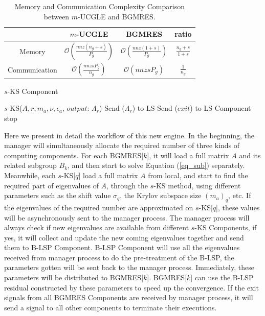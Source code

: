 \begin{table}[htbp]
	\renewcommand{\arraystretch}{1.4}
	\small	
	\caption{Memory and Communication Complexity Comparison between $m$-UCGLE and BGMRES.}
	\label{memory}
	\centering
	\begin{tabular}{c|c|c|c}
		\toprule
		& $m$-UCGLE & BGMRES & ratio  \\
		\midrule
		Memory  &$\mathcal{O}(\frac{nnz(n_g+s)}{P_{g}})$& $\mathcal{O}(\frac{nnz(1+s)}{P_{g}})$ & $\frac{n_g+s}{1+s}$\\
		\midrule
		Communication & $\mathcal{O}(\frac{nnzsP_g}{n_g})$ & $\mathcal{O}(nnzsP_g)$ & $\frac{1}{n_g}$   \\
		\bottomrule
	\end{tabular}
\end{table}

\begin{algorithm}[h]
	\label{skspc}
	\begin{algorithmic}[1]
		\caption{$s$-KS Component}   
		\State $s$-KS($A, r, m_a, \nu,\epsilon_a$, $output$: $\Lambda_r$)
		\State Send ($\Lambda_r$) to LS
		\State Send ($exit$) to LS Component  \State stop \EndIf
		\EndWhile
		\EndFunction
	\end{algorithmic}  
\end{algorithm}

Here we present in detail the workflow of this new engine. In the beginning, the manager will simultaneously allocate the required number of three kinds of computing components. For each BGMRES[$k$], it will load a full matrix $A$ and its related subgroup $B_k$, and then start to solve Equation (\ref{eq_sub}) separately. Meanwhile, each $s$-KS[$q$] load a full matrix $A$ from local, and start to find the required part of eigenvalues of $A$, through the $s$-KS method, using different parameters such as the shift value $\sigma_q$, the Krylov subspace size $(m_a)_q$, etc. If the eigenvalues of the required number are approximated on $s$-KS[$q$], these values will be asynchronously sent to the manager process. The manager process will always check if new eigenvalues are available from different $s$-KS Components, if yes, it will collect and update the new coming eigenvalues together and send them to B-LSP Component. B-LSP Component will use all the eigenvalues received from manager process to do the pre-treatment of the B-LSP, the parameters gotten will be sent back to the manager process. Immediately, these parameters will be distributed to BGMRES[$k$]. BGMRES[$k$] can use the B-LSP residual constructed by these parameters to speed up the convergence. If the exit signals from all BGMRES Components are received by manager process, it will send a signal to all other components to terminate their executions.

